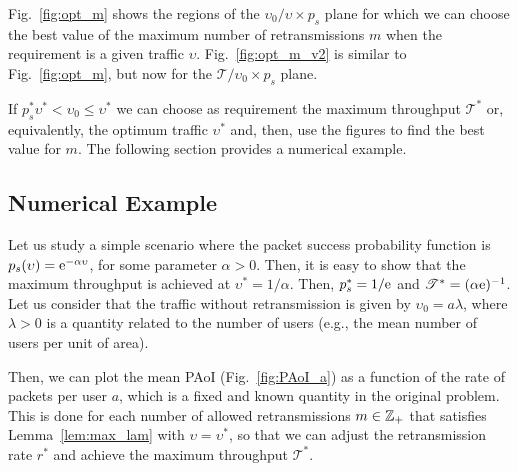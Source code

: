 Fig.~\ref{fig:opt_m} shows the regions of the $\upsilon_0/\upsilon \times p_s$ plane for which we can choose the best value of the maximum number of retransmissions $m$ when the requirement is a given traffic $\upsilon$.
%
Fig.~\ref{fig:opt_m_v2} is similar to Fig.~\ref{fig:opt_m}, but now for the $\mathscr{T}/\upsilon_0 \times p_s$ plane.

If $p_s^* \upsilon^* < \upsilon_0 \le \upsilon^*$ we can choose as requirement the maximum throughput $\mathscr{T}^*$ or, equivalently, the optimum traffic $\upsilon^*$ and, then, use the figures to find the best value for $m$.
%
The following section provides a numerical example.

\subsection{Numerical Example}

Let us study a simple scenario where the packet success probability function is $p_s(\upsilon) = \mathrm{e}^{-\alpha\upsilon}$, for some parameter $\alpha>0$. Then, it is easy to show that the maximum throughput is achieved at $\upsilon^* = 1/\alpha$. Then, $p_s^* = 1/\mathrm{e}$ and $\mathscr{T}^* = (\alpha\mathrm{e})^{-1}$.
%
Let us consider that the traffic without retransmission is given by $\upsilon_0 = a \lambda$, where $\lambda > 0$ is a quantity related to the number of users (e.g., the mean number of users per unit of area).

Then, we can plot the mean PAoI (Fig.~\ref{fig:PAoI_a}) as a function of the rate of packets per user $a$, which is a fixed and known quantity in the original problem. This is done for each number of allowed retransmissions $m\in{\mathbb Z}_+$ that satisfies Lemma~\ref{lem:max_lam} with $\upsilon=\upsilon^*$, so that we can adjust the retransmission rate $r^*$ and achieve the maximum throughput $\mathscr{T}^*$.

